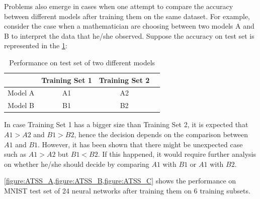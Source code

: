 \documentclass[conference]{IEEEtran}
\begin{document}
Problems also emerge in cases when one attempt to compare the accuracy between different models after training them on the same dataset. For example, consider the case when a mathematician are choosing between two models A and B to interpret the data that he/she observed. Suppose the accuracy on test set is represented in the \cref{table:perform}:

\begin{table}[ht]
\caption{Performance on test set of two different models} %
\centering %
\begin{tabular}{|c|c|c|c} %
\hline %
 { } & Training Set 1 & Training Set 2 \\ [0.5ex] %
\hline %
Model A & A1 & A2 \\ %
Model B & B1 & B2 \\ [1ex] %
\hline %
\end{tabular}
\label{table:perform} %
\end{table}

In case Training Set 1 has a bigger size than Training Set 2, it is expected that $A1 > A2$ and $B1 > B2$, hence the decision depends on the comparison between $A1$ and $B1$. However, it has been shown that there might be unexpected case such as $A1 > A2$ but $B1 < B2$. If this happened, it would require further analysis on whether he/she should decide by comparing $A1$ with $B1$ or $A1$ with $B2$.






\appendix
\cref{figure:ATSS_A,figure:ATSS_B,figure:ATSS_C}  shows the performance on MNIST test set of 24 neural networks after training them on 6 training subsets.
\end{document}
